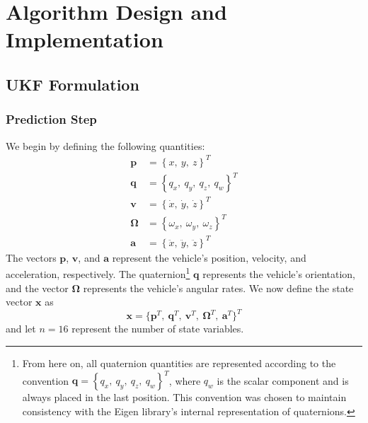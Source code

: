 \chapter{Algorithm Design and Implementation} \label{ch:Alg_Design}

\section{UKF Formulation} \label{sec:ukf_formulation}

\subsection{Prediction Step}

We begin by defining the following quantities:
%
\begin{align} \label{eq:state_vars}
\mathbf{p} &= \left\lbrace x,\ y,\ z \right\rbrace ^{T} \\
\mathbf{q} &= \left\lbrace q_{x},\ q_{y},\ q_{z},\ q_{w} \right\rbrace ^{T} \\
\mathbf{v} &= \left\lbrace \dot{x},\ \dot{y},\ \dot{z} \right\rbrace ^{T} \\
\bm{\Omega} &= \left\lbrace \omega_{x},\ \omega_{y},\ \omega_{z} \right\rbrace ^{T} \\
\mathbf{a} &= \left\lbrace \ddot{x},\ \ddot{y},\ \ddot{z} \right\rbrace ^{T}
\end{align}
%
The vectors $\mathbf{p}$, $\mathbf{v}$, and $\mathbf{a}$ represent the vehicle's position, velocity, and acceleration, respectively. The quaternion\footnote{From here on, all quaternion quantities are represented according to the convention $\mathbf{q} = \left\lbrace q_{x},\ q_{y},\ q_{z},\ q_{w} \right\rbrace ^{T}$, where $q_{w}$ is the scalar component and is always placed in the last position. This convention was chosen to maintain consistency with the Eigen library's internal representation of quaternions.} $\mathbf{q}$ represents the vehicle's orientation, and the vector $\bm{\Omega}$ represents the vehicle's angular rates. We now define the state vector $\mathbf{x}$ as
%
\begin{equation}
\mathbf{x} = 
\Big\{
    \mathbf{p}^{T},\
    \mathbf{q}^{T},\
    \mathbf{v}^{T},\
    \bm{\Omega}^{T},\
    \mathbf{a}^{T}
\Big\} ^{T}
\end{equation}
%
and let $n = 16$ represent the number of state variables.

